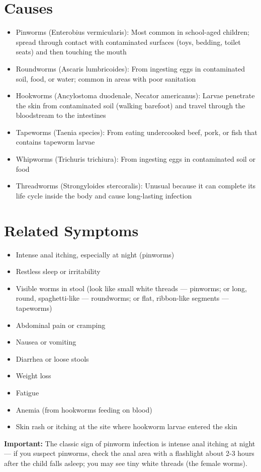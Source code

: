 \section*{Causes}
\begin{itemize}
  \item Pinworms (Enterobius vermicularis): Most common in school-aged children; spread through contact with contaminated surfaces (toys, bedding, toilet seats) and then touching the mouth
  \item Roundworms (Ascaris lumbricoides): From ingesting eggs in contaminated soil, food, or water; common in areas with poor sanitation
  \item Hookworms (Ancylostoma duodenale, Necator americanus): Larvae penetrate the skin from contaminated soil (walking barefoot) and travel through the bloodstream to the intestines
  \item Tapeworms (Taenia species): From eating undercooked beef, pork, or fish that contains tapeworm larvae
  \item Whipworms (Trichuris trichiura): From ingesting eggs in contaminated soil or food
  \item Threadworms (Strongyloides stercoralis): Unusual because it can complete its life cycle inside the body and cause long-lasting infection
\end{itemize}

\section*{Related Symptoms}
\begin{itemize}
  \item Intense anal itching, especially at night (pinworms)
  \item Restless sleep or irritability
  \item Visible worms in stool (look like small white threads — pinworms; or long, round, spaghetti-like — roundworms; or flat, ribbon-like segments — tapeworms)
  \item Abdominal pain or cramping
  \item Nausea or vomiting
  \item Diarrhea or loose stools
  \item Weight loss
  \item Fatigue
  \item Anemia (from hookworms feeding on blood)
  \item Skin rash or itching at the site where hookworm larvae entered the skin
\end{itemize}
\textbf{Important:} The classic sign of pinworm infection is intense anal itching at night — if you suspect pinworms, check the anal area with a flashlight about 2-3 hours after the child falls asleep; you may see tiny white threads (the female worms).

